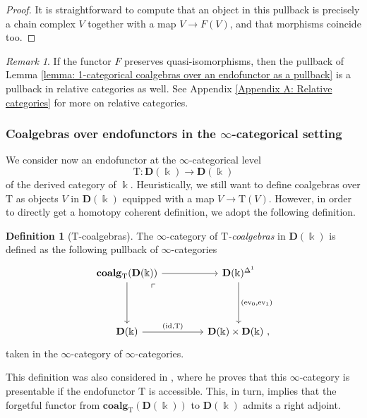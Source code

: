 \documentclass{proc-l}
\theoremstyle{plain}
\theoremstyle{definition}
\newtheorem{definition}[{theorem}]{Definition}
\theoremstyle{remark}
\newtheorem{remark}[{theorem}]{Remark}
\newcommand{\kk}{\Bbbk}
\begin{document}
\begin{proof}
It is straightforward to compute that an object in this pullback is precisely a chain complex $V$ together with a map $V \longrightarrow F(V)$, and that morphisms coincide too.
\end{proof}

\begin{remark}%
\label{Remark:4.3}If the functor $F$ preserves quasi-isomorphisms, then the pullback of Lemma \ref{lemma: 1-categorical coalgebras over an endofunctor as a pullback} is a pullback in relative categories as well. See Appendix \ref{Appendix A: Relative categories} for more on relative categories.
\end{remark}

\subsubsection{Coalgebras over endofunctors in the $\infty$-categorical setting}%
\label{Section:4.1.2} We consider now an endofunctor at the $\infty$-categorical level
\[
\mathrm{T}: \mathbf{D}(\kk) \longrightarrow \mathbf{D}(\kk)
\]
of the derived category of $\kk$. Heuristically, we still want to define coalgebras over $\mathrm{T}$ as objects $V$ in $\mathbf{D}(\kk)$ equipped with a map $V \longrightarrow \mathrm{T}(V)$. However, in order to directly get a homotopy coherent definition, we adopt the following definition.

\begin{definition}[{$\mathrm{T}$-coalgebras}]%
\label{Definition:4.4}\label{definition: infinity categorical coalgebras over an endofunctor}
The $\infty$-category of $\mathrm{T}$\textit{-coalgebras} in $\mathbf{D}(\kk)$ is defined as the following pullback of $\infty$-categories
\[
\begin{tikzcd}[column sep=3.5pc,row sep=3.5pc]
\mathbf{coalg}_{\mathrm{T}}(\mathbf{D}(\kk)) \arrow[r] \arrow[d] \arrow[dr, phantom, "\ulcorner", very near start]
& \mathbf{D}(\kk)^{\Delta^1} \arrow[d,"{(\mathrm{ev}_0,\mathrm{ev}_1)}"]  \\
\mathbf{D}(\kk) \arrow[r,"{(\mathrm{id}, \mathrm{T})}"]
& \mathbf{D}(\kk) \times  \mathbf{D}(\kk)~,
\end{tikzcd}
\]
taken in the $\infty$-category of $\infty$-categories.
\end{definition}

This definition was also considered in \cite[Section 7]{heuts2024}, where he proves that this $\infty$-category is presentable if the endofunctor $\mathrm{T}$ is accessible. This, in turn, implies that the forgetful functor from $\mathbf{coalg}_{\mathrm{T}}(\mathbf{D}(\kk))$ to $\mathbf{D}(\kk)$ admits a right adjoint.
\end{document}
